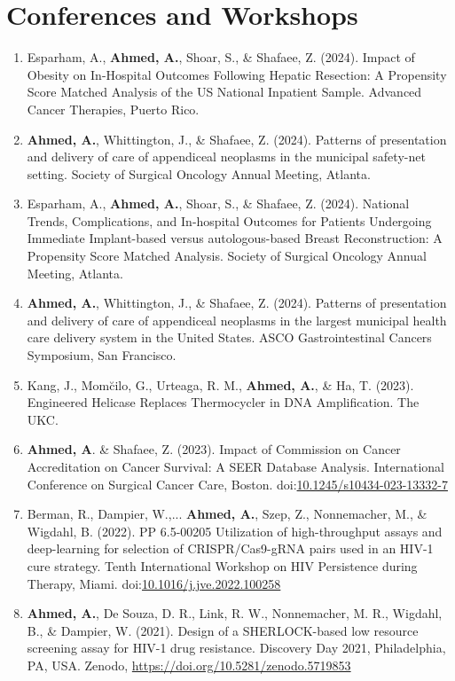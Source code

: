 \documentclass[letterpaper,11pt]{article}
\newcommand{\resumeItem}[2]{
  \item\small{
    \textbf{#1}{ #2 \vspace{-2pt}}
  }
}
\newcommand{\resumeSubItem}[2]{\resumeItem{#1}{#2}\vspace{-4pt}}
\begin{document}
\section{Conferences and Workshops}
  \begin{enumerate}[leftmargin=*]
  \resumeSubItem{}
    {Esparham, A., \textbf{Ahmed, A.}, Shoar, S., \& Shafaee, Z. (2024). Impact of Obesity on In-Hospital Outcomes Following Hepatic Resection: A Propensity Score Matched Analysis of the US National Inpatient Sample. Advanced Cancer Therapies, Puerto Rico.}
  \resumeSubItem{}
    {\textbf{Ahmed, A.}, Whittington, J., \& Shafaee, Z. (2024). Patterns of presentation and delivery of care of appendiceal neoplasms in the municipal safety-net setting. Society of Surgical Oncology Annual Meeting, Atlanta.}
  \resumeSubItem{}
    {Esparham, A., \textbf{Ahmed, A.}, Shoar, S., \& Shafaee, Z. (2024). National Trends, Complications, and In-hospital Outcomes for Patients Undergoing Immediate Implant-based versus autologous-based Breast Reconstruction: A Propensity Score Matched Analysis. Society of Surgical Oncology Annual Meeting, Atlanta.}
  \resumeSubItem{}
    {\textbf{Ahmed, A.}, Whittington, J., \& Shafaee, Z. (2024). Patterns of presentation and delivery of care of appendiceal neoplasms in the largest municipal health care delivery system in the United States. ASCO Gastrointestinal Cancers Symposium, San Francisco.}
  \resumeSubItem{}
    {Kang, J., Mom\u cilo, G., Urteaga, R. M., \textbf{Ahmed, A.}, \& Ha, T. (2023). Engineered Helicase Replaces Thermocycler in DNA Amplification. The UKC.}
  \resumeSubItem{}
    {\textbf{Ahmed, A}. \& Shafaee, Z. (2023). Impact of Commission on Cancer Accreditation on Cancer Survival: A SEER Database Analysis. International Conference on Surgical Cancer Care, Boston. doi:\href{https://doi.org/10.1245/s10434-023-13332-7}{10.1245/s10434-023-13332-7}}
  \resumeSubItem{}
    {Berman, R., Dampier, W.,... \textbf{Ahmed, A.}, Szep, Z., Nonnemacher, M., \& Wigdahl, B. (2022). PP 6.5-00205 Utilization of high-throughput assays and deep-learning for selection of CRISPR/Cas9-gRNA pairs used in an HIV-1 cure strategy. Tenth International Workshop on HIV Persistence during Therapy, Miami. doi:\href{https://doi.org/10.1016/j.jve.2022.100258}{10.1016/j.jve.2022.100258}}
  \resumeSubItem{}
    {\textbf{Ahmed, A.}, De Souza, D. R., Link, R. W., Nonnemacher, M. R., Wigdahl, B., \& Dampier, W. (2021). Design of a SHERLOCK-based low resource screening assay for HIV-1 drug resistance. Discovery Day 2021, Philadelphia, PA, USA. Zenodo, \href{https://doi.org/10.5281/zenodo.5719853}{https://doi.org/10.5281/zenodo.5719853}}
  \end{enumerate}
  \vspace{-4pt}
\end{document}
